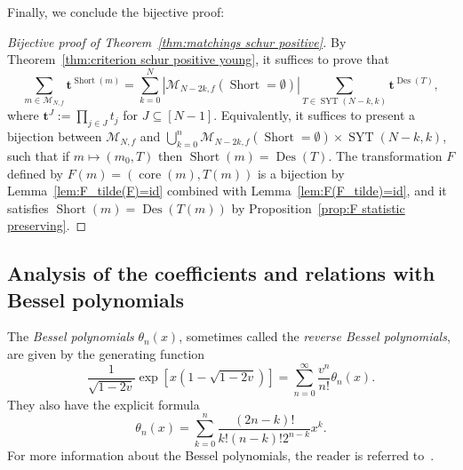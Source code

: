 \documentclass[ALCO]{cedram}
\newcommand{\Des}{\operatorname{Des}}
\newcommand{\Syt}{\operatorname{SYT}}
\newcommand{\Short}{\operatorname{Short}}
\newcommand{\core}{\operatorname{core}}
\newcommand{\M}{\mathcal{M}}
\begin{document}
Finally, we conclude the bijective proof:
\begin{proof}[Bijective proof of Theorem~\ref{thm:matchings schur positive}]
    By Theorem~\ref{thm:criterion schur positive young}, it suffices to prove that
    \[
        \sum_{m \in \M_{N,f}} \boldsymbol{t}^{\Short(m)} = \sum_{k=0}^N |\M_{N-2k,f}(\Short = \emptyset)| \sum_{T \in \Syt(N-k,k)} \boldsymbol{t}^{\Des(T)},
    \]
    where $\boldsymbol{t}^J := \prod_{j \in J} t_j$ for $J \subseteq [N-1]$.
    Equivalently, it suffices to present a bijection between $\M_{N,f}$ and $\bigcup_{k=0}^n \M_{N-2k,f}(\Short = \emptyset) \times \Syt(N-k,k)$, such that if $m \mapsto (m_0,T)$ then $\Short(m) = \Des(T)$. The transformation $F$ defined by $F(m) = (\core(m),T(m))$ is a bijection by Lemma~\ref{lem:F_tilde(F)=id} combined with Lemma~\ref{lem:F(F_tilde)=id}, and it satisfies $\Short(m) = \Des(T(m))$ by Proposition~\ref{prop:F statistic preserving}.
\end{proof}








    


    


        
    





            
            


            
            


            
            






\subsection{Analysis of the coefficients and relations with Bessel polynomials}
\label{subsec:schur coefficients bessel}
The \emph{Bessel polynomials} $\theta_n(x)$, sometimes called the \emph{reverse Bessel polynomials}, are given by the generating function
\[
    \frac{1}{\sqrt{1-2v}} \exp\left[x(1-\sqrt{1-2v})\right] = \sum_{n=0}^\infty \frac{v^n}{n!} \theta_n(x).
\]
They also have the explicit formula
\[
    \theta_n(x) = \sum_{k=0}^n \frac{(2n-k)!}{k!(n-k)!2^{n-k}} x^k.
\]
For more information about the Bessel polynomials, the reader is referred to~\cite{bessel_polynomials_book}.
\end{document}
